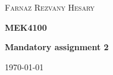 \documentclass[main.tex]{subfiles}
\begin{document}
\begin{titlepage}
	\centering
	{\scshape\LARGE Farnaz Rezvany Hesary \par}
	\vspace{1.5cm}
	{\huge\bfseries MEK4100 \par}
	\vspace{1.5cm}
	{\huge\bfseries Mandatory assignment 2 \par}
	
	\vfill

	{\Large \today\par}
\end{titlepage}
\end{document}
